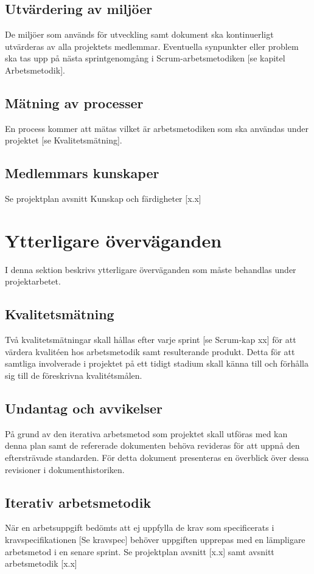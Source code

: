 \documentclass[a4paper,10pt]{article}
\begin{document}
\subsection{Utvärdering av miljöer}
De miljöer som används för utveckling samt dokument ska kontinuerligt utvärderas av alla projektets medlemmar. Eventuella synpunkter eller problem ska tas upp på nästa sprintgenomgång i Scrum-arbetsmetodiken [se kapitel Arbetsmetodik].

\subsection{Mätning av processer}
En process kommer att mätas vilket är arbetsmetodiken som ska användas under projektet [se Kvalitetsmätning].

\subsection{Medlemmars kunskaper}
Se projektplan avsnitt Kunskap och färdigheter [x.x]

\section{Ytterligare överväganden}
I denna sektion beskrivs ytterligare överväganden som måste behandlas under projektarbetet.
\subsection{Kvalitetsmätning}
\label{sec:Kvalitetsmatning}
Två kvalitetsmätningar skall hållas efter varje sprint [se Scrum-kap xx] för att värdera kvalitéen hos arbetsmetodik samt resulterande produkt. 
Detta för att samtliga involverade i  projektet på ett tidigt stadium skall känna till och förhålla sig till de föreskrivna kvalitétsmålen.

\subsection{Undantag och avvikelser}
På grund av den iterativa arbetsmetod som projektet skall utföras med kan denna plan samt de refererade dokumenten behöva revideras för att uppnå den eftersträvade standarden. För detta dokument presenteras en överblick över dessa revisioner i dokumenthistoriken.

\subsection{Iterativ arbetsmetodik}
När en arbetsuppgift bedömts att ej uppfylla de krav som specificerats i kravspecifikationen [Se kravspec] behöver uppgiften upprepas med en lämpligare arbetsmetod i en senare sprint. Se projektplan avsnitt [x.x] samt avsnitt arbetsmetodik [x.x]
\end{document}
